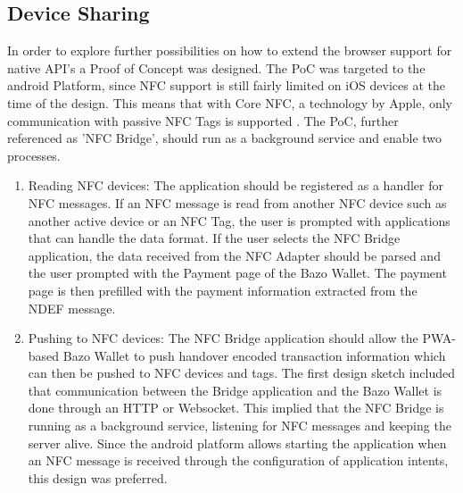 \subsection{Device Sharing}\label{pocnfcbridge}
In order to explore further possibilities on how to extend the browser support for native API's a Proof of Concept was designed. The PoC was targeted to the android Platform, since NFC support is still fairly limited on iOS devices at the time of the design. This means that with Core NFC, a technology by Apple, only communication with passive NFC Tags is supported \cite{corenfc}. The PoC, further referenced as 'NFC Bridge', should run as a background service and enable two processes.
\begin{enumerate}
\item Reading NFC devices:
The application should be registered as a handler for NFC messages. If an NFC message is read from another NFC device such as another active device or an NFC Tag, the user is prompted with applications that can handle the data format. If the user selects the NFC Bridge application, the data received from the NFC Adapter should be parsed and the user prompted with the Payment page of the Bazo Wallet. The payment page is then prefilled with the payment information extracted from the NDEF message.
\item Pushing to NFC devices: The NFC Bridge application should allow the PWA-based Bazo Wallet to push handover encoded transaction information which can then be pushed to NFC devices and tags.
The first design sketch included that communication between the Bridge application and the Bazo Wallet is done through an HTTP or Websocket. This implied that the NFC Bridge is running as a background service, listening for NFC messages and keeping the server alive.
Since the android platform allows starting the application when an NFC message is received through the configuration of application intents, this design was preferred.
\end{enumerate}

